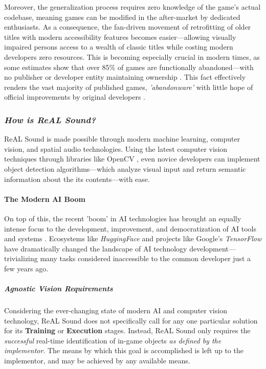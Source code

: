 \documentclass{report}
\newcommand{\rs}{ReAL Sound\xspace}
\begin{document}
Moreover, the generalization process requires zero knowledge of the game's actual codebase, meaning games can be modified in the after-market by dedicated enthusiasts. As a consequence, the fan-driven movement of retrofitting of older titles with modern accessibility features becomes easier---allowing visually impaired persons access to a wealth of classic titles while costing modern developers zero resources. This is becoming especially crucial in modern times, as some estimates show that over 85\% of games are functionally abandoned---with no publisher or developer entity maintaining ownership \cite{Lewin_2023}. This fact effectively renders the vast majority of published games, \emph{'abandonware'} with little hope of official improvements by original developers \cite{Costikyan_2000}.

\subsubsection{\emph{How is \rs?}}
\rs is made possible through modern machine learning, computer vision, and spatial audio technologies. Using the latest computer vision techniques through libraries like OpenCV \cite{opencv_library}, even novice developers can implement object detection algorithms---which analyze visual input and return semantic information about the its contents---with ease. 

\paragraph{The Modern AI Boom}

On top of this, the recent 'boom' in AI technologies \cite{Knight_2023} \cite{Meredith_2023} has brought an equally intense focus to the development, improvement, and democratization of AI tools and systems \cite{Brynjolfsson_McAfee_2017} \cite{Heikkilä_2022}. Ecosystems like \emph{HuggingFace} \cite{Wiggers_2022} and projects like Google's \emph{TensorFlow} \cite{tensorflow2015-whitepaper} have dramatically changed the landscape of AI technology development---trivializing many tasks considered inaccessible to the common developer just a few years ago.

\subparagraph{Agnostic Vision Requirements}

Considering the ever-changing state of modern AI and computer vision technology, \rs does not specifically call for any one particular solution for its \textbf{Training} or \textbf{Execution} stages. Instead, \rs only requires the \emph{successful} real-time identification of in-game objects \textit{as defined by the implementor}. The means by which this goal is accomplished is left up to the implementor, and may be achieved by any available means. 
\end{document}
